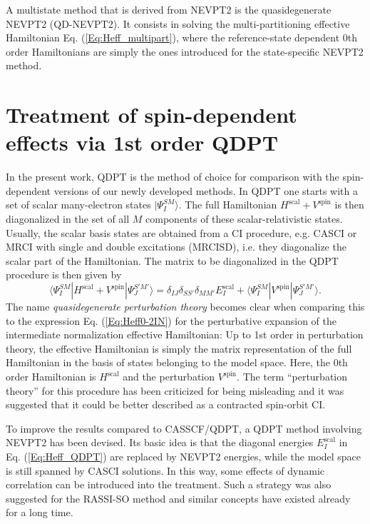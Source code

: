 A multistate method that is derived from NEVPT2 is the quasidegenerate NEVPT2 (QD-NEVPT2).\cite{AngelBCC_2004_4043} It consists in solving the multi-partitioning effective Hamiltonian Eq. (\ref{Eq:Heff_multipart}), where the reference-state dependent 0th order Hamiltonians are simply the ones introduced for the state-specific NEVPT2 method.

\section{Treatment of spin-dependent effects via 1st order QDPT}
In the present work, QDPT is the method of choice for comparison with the spin-dependent versions of our newly developed methods. In QDPT one starts with a set of scalar many-electron states $|\Psi_I^{SM}\rangle$. The full Hamiltonian $H^\text{scal} + V^\text{spin}$ is then diagonalized in the set of all $M$ components of these scalar-relativistic states. Usually, the scalar basis states are obtained from a CI procedure, e.g. CASCI or MRCI with single and double excitations (MRCISD), i.e. they diagonalize the scalar part of the Hamiltonian. The matrix to be diagonalized in the QDPT procedure is then given by
\begin{equation}
\label{Eq:Heff_QDPT}
\langle \Psi_I^{SM}|H^\text{scal}+V^\text{spin}|\Psi_J^{S'M'}\rangle = \delta_{IJ} \delta_{SS'} \delta_{MM'} E_I^\text{scal} + \langle \Psi_I^{SM} | V^\text{spin} | \Psi_J^{S'M'}\rangle.
\end{equation}
The name \emph{quasidegenerate perturbation theory} becomes clear when comparing this to the expression Eq. (\ref{Eq:Heff0-2IN}) for the perturbative expansion of the intermediate normalization effective Hamiltonian: Up to 1st order in perturbation theory, the effective Hamiltonian is simply the matrix representation of the full Hamiltonian in the basis of states belonging to the model space. Here, the 0th order Hamiltonian is $H^\text{scal}$ and the perturbation $V^\text{spin}$. The term ``perturbation theory'' for this procedure has been criticized for being misleading and it was suggested that it could be better described as a contracted spin-orbit CI.\cite{BuenkALLH_1998_3400}

To improve the results compared to CASSCF/QDPT, a QDPT method involving NEVPT2 has been devised.\cite{DubocGSCN_2010_10750} Its basic idea is that the diagonal energies $E_I^\text{scal}$ in Eq. (\ref{Eq:Heff_QDPT}) are replaced by NEVPT2 energies, while the model space is still spanned by CASCI solutions. In this way, some effects of dynamic correlation can be introduced into the treatment. Such a strategy was also suggested for the RASSI-SO method\cite{MalmqRS_2002_230} and similar concepts have existed already for a long time.\cite{LlusaCBS_1996_5321, BaranS_2003_7439}

